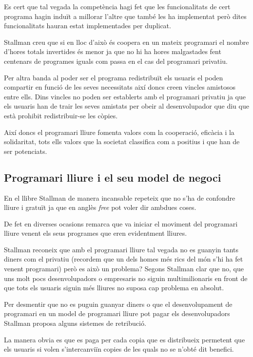 \documentclass[a4paper,10pt]{scrartcl}
\begin{document}
Es cert que tal vegada la competència hagi fet que les funcionalitats de cert programa
hagin induït a millorar l'altre que també les ha implementat però dites
funcionalitats hauran estat implementades per duplicat.

Stallman creu que si en lloc d'això és coopera en un mateix programari el nombre
d'hores totals invertides és menor ja que no hi ha hores malgastades fent centenars
de programes iguals com passa en el cas del programari privatiu.

Per altra banda al poder ser el programa redistribuït els usuaris el
poden compartir en funció de les seves necessitats així doncs creen
vincles amistosos entre ells. Dins vincles no poden ser establerts
amb el programari privatiu ja que els usuaris han de trair les seves
amistats per obeir al desenvolupador que diu que està prohibit redistribuir-se les còpies.

Així doncs el programari lliure fomenta valors com la cooperació, eficàcia i la solidaritat,
tots ells valors que la societat classifica com a positius i que han de ser potenciats.

\subsection{Programari lliure i el seu model de negoci}
En el llibre Stallman de manera incansable repeteix que no s'ha de confondre
lliure i gratuït ja que en anglès \emph{free} pot voler dir ambdues coses.

De fet en diverses ocasions remarca que va iniciar el moviment del programari lliure
venent els seus programes que eren evidentment lliures.

Stallman reconeix que amb el programari lliure tal vegada no es guanyin tants
diners com el privatiu (recordem que un dels homes més rics del món s'hi ha fet 
venent programari) però es això un problema? Segons Stallman clar que no, que uns
molt pocs desenvolupadors o empresaris no siguin multimilionaris en front
de que tots els usuaris siguin més lliures no suposa cap problema en absolut.

Per desmentir que no es puguin guanyar diners o que el desenvolupament
de programari en un model de programari lliure pot pagar els desenvolupadors
Stallman proposa alguns sistemes de retribució.

La manera obvia es que es paga per cada copia que es distribueix
permetent que els usuaris si volen s'intercanviïn copies de les quals
no se n'obté dit benefici.
\end{document}
